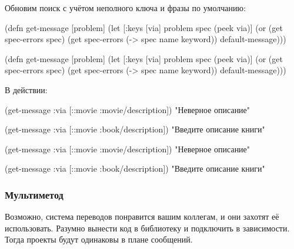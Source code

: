 \fi

Обновим поиск с учётом неполного ключа и фразы по умолчанию:

\ifx\DEVICETYPE\MOBILE

\begin{english}
  \begin{clojure}
(defn get-message
  [problem]
  (let [{:keys [via]} problem
        spec (peek via)]
    (or (get spec-errors spec)
        (get spec-errors
          (-> spec name keyword))
        default-message)))
  \end{clojure}
\end{english}

\else

\begin{english}
  \begin{clojure}
(defn get-message
  [problem]
  (let [{:keys [via]} problem
        spec (peek via)]
    (or (get spec-errors spec)
        (get spec-errors (-> spec name keyword))
        default-message)))
  \end{clojure}
\end{english}

\fi

\noindent
В действии:

\ifx\DEVICETYPE\MOBILE

  \begin{clojure}
(get-message
  {:via [::movie :movie/description]})
"Неверное описание"

(get-message
  {:via [::movie :book/description]})
"Введите описание книги"
  \end{clojure}

\else

  \begin{clojure}
(get-message {:via [::movie :movie/description]})
"Неверное описание"

(get-message {:via [::movie :book/description]})
"Введите описание книги"
  \end{clojure}

\fi

\subsubsection{Мультиметод}

Возможно, система переводов понравится вашим коллегам, и они захотят её
использовать. Разумно вынести код в библиотеку и подключить в зависимости. Тогда
проекты будут одинаковы в плане сообщений.

